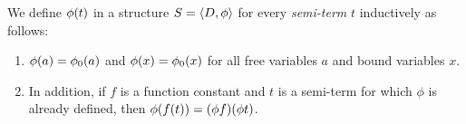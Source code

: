 \documentclass[11pt,a4paper]{article}
\begin{document}
\begin{definition}\label{def:extension of structure map}
    We define \(\phi(t)\) in a structure \(S = \langle D,\phi\rangle\)
    for every \emph{semi-term} \(t\) inductively
    as follows:
    \begin{enumerate}
    \item
        \(\phi(a) = \phi_0(a)\) and \(\phi(x) = \phi_0(x)\)
        for all free variables \(a\) and bound variables \(x\).
    \item
        In addition,
        if \(f\) is a function constant and \(t\) is a semi-term for which \(\phi\)
        is already defined, then \(\phi(f(t)) = (\phi f)(\phi t)\).
    \end{enumerate}
\end{definition}
\end{document}

